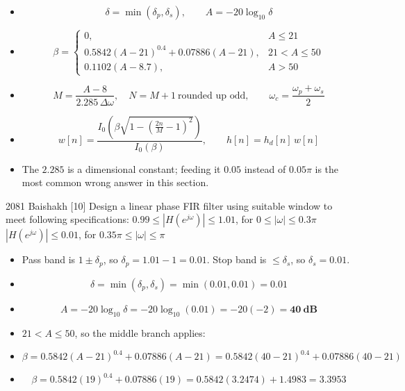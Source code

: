 \begin{itemize}
  \item[] \[ \delta=\min(\delta_p,\delta_s),\qquad A=-20\log_{10}\delta \]
  \item[] \[ \beta=\begin{cases}
                0, & A\le21\\
                0.5842(A-21)^{0.4}+0.07886(A-21), & 21<A\le50\\
                0.1102(A-8.7), & A>50
             \end{cases} \]
  \item[] \[ M=\frac{A-8}{2.285\,\Delta\omega},\quad N=M+1\ \text{rounded up odd},\qquad
             \omega_c=\frac{\omega_p+\omega_s}{2} \]
  \item[] \[ w[n]=\frac{I_0\!\left(\beta\sqrt{1-\left(\frac{2n}{M}-1\right)^{2}}\right)}
                       {I_0(\beta)},\qquad h[n]=h_d[n]\,w[n] \]
  \item {} The
        $2.285$ is a dimensional constant; feeding it $0.05$ instead of $0.05\pi$ is the
        most common wrong answer in this section.
\end{itemize}

\begin{asked}{2081 Baishakh \textperiodcentered{} [10]}
Design a linear phase FIR filter using suitable window to meet following
specifications:\newline
$0.99\le|H(e^{j\omega})|\le1.01$, \quad for $0\le|\omega|\le0.3\pi$\newline
$|H(e^{j\omega})|\le0.01$, \quad for $0.35\pi\le|\omega|\le\pi$
\end{asked}

\begin{itemize}
  \item Pass band is $1\pm\delta_p$, so $\delta_p=1.01-1=0.01$. Stop band is
        $\le\delta_s$, so $\delta_s=0.01$.
  \item[] \[ \delta=\min(\delta_p,\delta_s)=\min(0.01,0.01)=\mathbf{0.01} \]
  \item[] \[ A=-20\log_{10}\delta=-20\log_{10}(0.01)=-20(-2)=\mathbf{40\ \text{dB}} \]
\end{itemize}

\begin{itemize}
  \item $21<A\le50$, so the middle branch applies:
  \item[] \[ \beta=0.5842(A-21)^{0.4}+0.07886(A-21)
             =0.5842(40-21)^{0.4}+0.07886(40-21) \]
  \item[] \[ \beta=0.5842(19)^{0.4}+0.07886(19)=0.5842(3.2474)+1.4983=\mathbf{3.3953} \]
\end{itemize}

